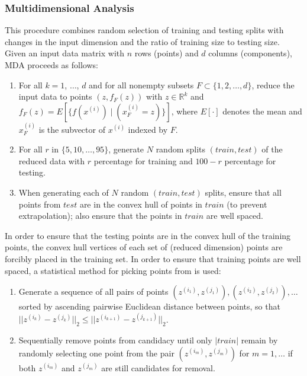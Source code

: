 \documentclass{scspaperproc}
\theoremstyle{scsthe}
\begin{document}
\subsubsection{Multidimensional Analysis}
\vspace{-10pt}
This procedure combines random selection of training and testing
splits with changes in the input dimension and the ratio of training
size to testing size. Given an input data matrix with $n$ rows
(points) and $d$ columns (components), MDA proceeds as follows:
\begin{enumerate}
\item For all $k = 1$, $\ldots$, $d$ and for all nonempty subsets $F
  \subset \{1, 2, \ldots, d\}$, reduce the input data to points $(z,
  f_F(z))$ with $z \in \mathbb{R}^k$ and $f_F(z) = E[ \{ f(x^{(i)})
    \mid (x^{(i)}_F = z) \} ]$, where $E[\cdot]$ denotes the mean and
  $x^{(i)}_F$ is the subvector of $x^{(i)}$ indexed by $F$.
\item For all $r$ in $\{5, 10, \ldots, 95\}$, generate $N$ random
  splits $(train, test)$ of the reduced data with $r$ percentage for
  training and $100 - r$ percentage for testing.
\item When generating each of $N$ random $(train, test)$ splits,
  ensure that all points from $test$ are in the convex hull of points
  in $train$ (to prevent extrapolation); also ensure that the points
  in $train$ are well spaced.
\end{enumerate}

In order to ensure that the testing points are in the convex hull of
the training points, the convex hull vertices of each set of (reduced
dimension) points are forcibly placed in the training set. In order to
ensure that training points are well spaced, a statistical method for
picking points from  is used:
\begin{enumerate}
\item Generate a sequence of all pairs of points
  ${(z^{(i_1)},z^{(j_1)}), (z^{(i_2)},z^{(j_2)}), \ldots}$ sorted by
  ascending pairwise Euclidean distance between points, so that
  $||z^{(i_k)}-z^{(j_k)}||_2 \leq ||z^{(i_{k+1})}-z^{(j_{k+1})}||_2$.
\item Sequentially remove points from candidacy until only $|train|$
  remain by randomly selecting one point from the pair $(z^{(i_m)},
  z^{(j_m)})$ for $m = 1,\ldots$ if both $z^{(i_m)}$ and $z^{(j_m)}$
  are still candidates for removal.
\end{enumerate}
\end{document}
